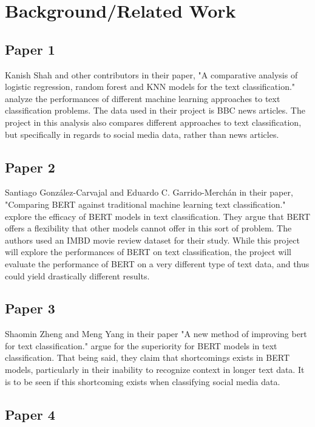 \documentclass[twocolumn]{article}
\begin{document}
\section{Background/Related Work}

\subsection{Paper 1}

Kanish Shah and other contributors in their paper, "A comparative analysis of logistic regression, random forest and KNN models for the text classification." analyze the performances of different machine learning approaches to text classification problems. The data used in their project is BBC news articles. The project in this analysis also compares different approaches to text classification, but specifically in regards to social media data, rather than news articles.

\subsection{Paper 2}

Santiago González-Carvajal and Eduardo C. Garrido-Merchán in their paper, "Comparing BERT against traditional machine learning text classification." explore the efficacy of BERT models in text classification. They argue that BERT offers a flexibility that other models cannot offer in this sort of problem. The authors used an IMBD movie review dataset for their study. While this project will explore the performances of BERT on text classification, the project will evaluate the performance of BERT on a very different type of text data, and thus could yield drastically different results.

\subsection{Paper 3}

Shaomin Zheng and Meng Yang in their paper "A new method of improving bert for text classification." argue for the superiority for BERT models in text classification. That being said, they claim that shortcomings exists in BERT models, particularly in their inability to recognize context in longer text data. It is to be seen if this shortcoming exists when classifying social media data.

\subsection{Paper 4}
\end{document}
